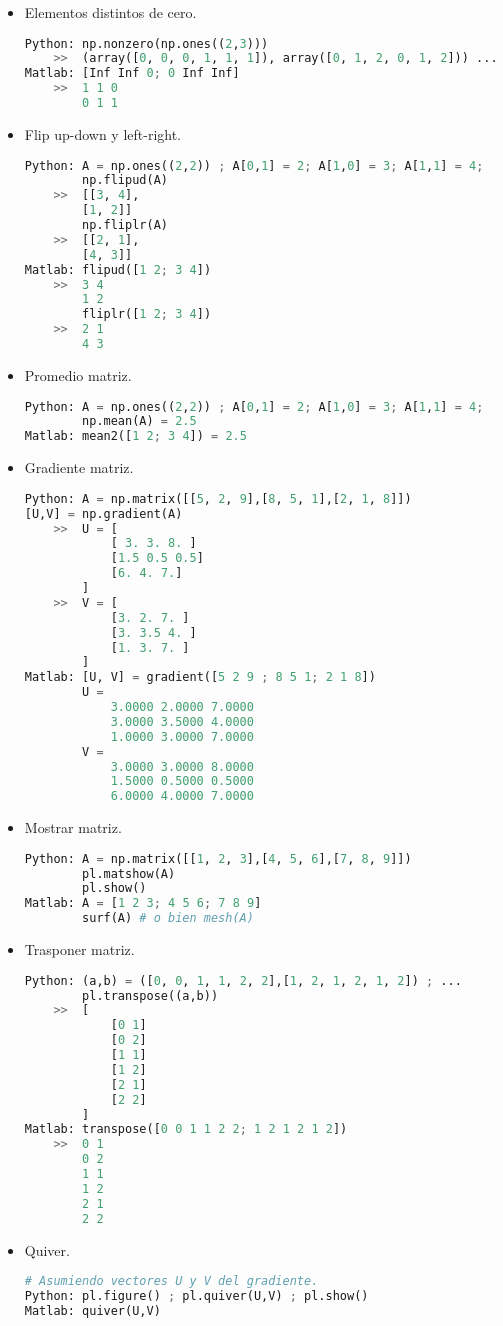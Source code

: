 \documentclass[letterpaper,11pt]{article} %
\begin{document}
\begin{itemize}
\item{
Elementos distintos de cero.
\begin{lstlisting}[language=Python]
Python: np.nonzero(np.ones((2,3)))
	>>	(array([0, 0, 0, 1, 1, 1]), array([0, 1, 2, 0, 1, 2])) ...
Matlab: [Inf Inf 0; 0 Inf Inf]
	>>	1 1 0
		0 1 1
\end{lstlisting}
}

\newpage
\item{
Flip up-down y left-right.
\begin{lstlisting}[language=Python]
Python: A = np.ones((2,2)) ; A[0,1] = 2; A[1,0] = 3; A[1,1] = 4;
		np.flipud(A)
	>>	[[3, 4],
		[1, 2]]
		np.fliplr(A)
	>>	[[2, 1],
		[4, 3]]
Matlab: flipud([1 2; 3 4])
	>>	3 4
		1 2
		fliplr([1 2; 3 4])
	>>	2 1
		4 3
\end{lstlisting}
}

\item{
Promedio matriz.
\begin{lstlisting}[language=Python]
Python: A = np.ones((2,2)) ; A[0,1] = 2; A[1,0] = 3; A[1,1] = 4;
		np.mean(A) = 2.5
Matlab: mean2([1 2; 3 4]) = 2.5
\end{lstlisting}
}

\item{
Gradiente matriz.
\begin{lstlisting}[language=Python]
Python: A = np.matrix([[5, 2, 9],[8, 5, 1],[2, 1, 8]])
[U,V] = np.gradient(A)
	>>	U = [
			[ 3. 3. 8. ]
			[1.5 0.5 0.5]
			[6. 4. 7.]
		]
	>>	V = [
			[3. 2. 7. ]
			[3. 3.5 4. ]
			[1. 3. 7. ]
		]
Matlab: [U, V] = gradient([5 2 9 ; 8 5 1; 2 1 8])
		U =
			3.0000 2.0000 7.0000
			3.0000 3.5000 4.0000
			1.0000 3.0000 7.0000
		V =
			3.0000 3.0000 8.0000
			1.5000 0.5000 0.5000
			6.0000 4.0000 7.0000
\end{lstlisting}
}

\item{
Mostrar matriz.
\begin{lstlisting}[language=Python]
Python: A = np.matrix([[1, 2, 3],[4, 5, 6],[7, 8, 9]])
		pl.matshow(A)
		pl.show()
Matlab: A = [1 2 3; 4 5 6; 7 8 9]
		surf(A) # o bien mesh(A)
\end{lstlisting}
}

\item{
Trasponer matriz.
\begin{lstlisting}[language=Python]
Python: (a,b) = ([0, 0, 1, 1, 2, 2],[1, 2, 1, 2, 1, 2]) ; ...
		pl.transpose((a,b))
	>>	[
			[0 1]
			[0 2]
			[1 1]
			[1 2]
			[2 1]
			[2 2]
		]
Matlab: transpose([0 0 1 1 2 2; 1 2 1 2 1 2])
	>>	0 1
		0 2
		1 1
		1 2
		2 1
		2 2
\end{lstlisting}
}

\item{
Quiver.
\begin{lstlisting}[language=Python]
# Asumiendo vectores U y V del gradiente.
Python: pl.figure() ; pl.quiver(U,V) ; pl.show()
Matlab: quiver(U,V)
\end{lstlisting}
}
	
\end{itemize}

\end{document}
